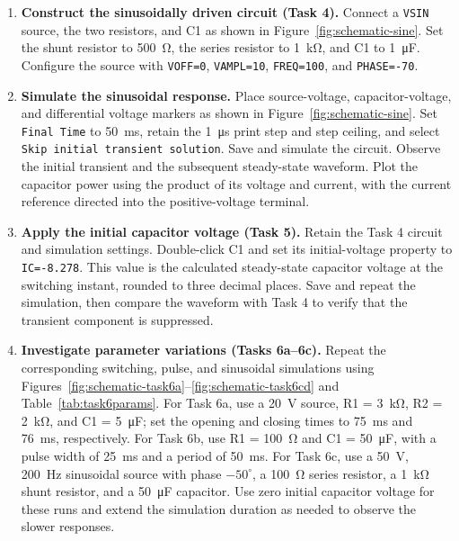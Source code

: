 \documentclass[12pt,a4paper]{article}
\begin{document}
\begin{enumerate}[label=\arabic*., leftmargin=2.5em, itemsep=6pt]
		\item \textbf{Construct the sinusoidally driven circuit (Task 4).}
		Connect a \texttt{VSIN} source, the two resistors, and C1 as
		shown in Figure~\ref{fig:schematic-sine}.  Set the shunt
		resistor to \SI{500}{\ohm}, the series resistor to
		\SI{1}{\kilo\ohm}, and C1 to \SI{1}{\micro\farad}.
		Configure the source with \texttt{VOFF=0},
		\texttt{VAMPL=10}, \texttt{FREQ=100}, and
		\texttt{PHASE=-70}.
		
		\item \textbf{Simulate the sinusoidal response.}
		Place source-voltage, capacitor-voltage, and differential
		voltage markers as shown in Figure~\ref{fig:schematic-sine}.
		Set \texttt{Final Time} to \SI{50}{\milli\second}, retain
		the \SI{1}{\micro\second} print step and step ceiling, and
		select \texttt{Skip initial transient solution}.
		Save and simulate the circuit.  Observe the initial transient
		and the subsequent steady-state waveform.  Plot the capacitor
		power using the product of its voltage and current, with the
		current reference directed into the positive-voltage terminal.
		
		\item \textbf{Apply the initial capacitor voltage (Task 5).}
		Retain the Task 4 circuit and simulation settings.
		Double-click C1 and set its initial-voltage property to
		\texttt{IC=-8.278}.  This value is the calculated
		steady-state capacitor voltage at the switching instant,
		rounded to three decimal places.  Save and repeat the
		simulation, then compare the waveform with Task 4 to verify
		that the transient component is suppressed.
		
		\item \textbf{Investigate parameter variations (Tasks 6a--6c).}
		Repeat the corresponding switching, pulse, and sinusoidal
		simulations using
		Figures~\ref{fig:schematic-task6a}--\ref{fig:schematic-task6cd}
		and Table~\ref{tab:task6params}.  For Task 6a, use a
		\SI{20}{\volt} source, R1 = \SI{3}{\kilo\ohm},
		R2 = \SI{2}{\kilo\ohm}, and C1 = \SI{5}{\micro\farad};
		set the opening and closing times to \SI{75}{\milli\second}
		and \SI{76}{\milli\second}, respectively.
		For Task 6b, use R1 = \SI{100}{\ohm} and
		C1 = \SI{50}{\micro\farad}, with a pulse width of
		\SI{25}{\milli\second} and a period of
		\SI{50}{\milli\second}.  For Task 6c, use a
		\SI{50}{\volt}, \SI{200}{\hertz} sinusoidal source with
		phase $-50^\circ$, a \SI{100}{\ohm} series resistor,
		a \SI{1}{\kilo\ohm} shunt resistor, and a
		\SI{50}{\micro\farad} capacitor.  Use zero initial
		capacitor voltage for these runs and extend the simulation
		duration as needed to observe the slower responses.
		

\end{enumerate}
\end{document}
